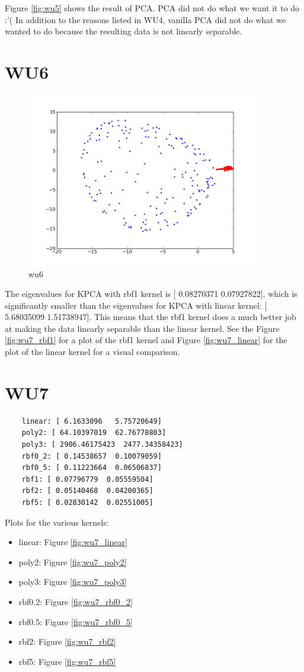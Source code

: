 Figure \ref{fig:wu5} shows the result of PCA. 
PCA did not do what we want it to do :'(
In addition to the reasons listed in WU4, vanilla PCA 
did not do what we wanted to do because the resulting data 
is not linearly separable.

\section*{WU6}
\begin{figure}[here]
	\center
	\caption{wu6}
	\label{fig:wu6}
	\includegraphics[width=4.0in]{img/wu7_rbf1.png}
\end{figure}

The eigenvalues for KPCA with rbf1 kernel is [ 0.08270371  0.07927822], which is significantly smaller than
the eigenvalues for KPCA with linear kernel: [ 5.68035099  1.51738947]. This means that the rbf1 kernel does a much 
better job at making the data linearly separable than the linear kernel. See the Figure \ref{fig:wu7_rbf1} for a plot of the rbf1 kernel and Figure \ref{fig:wu7_linear} for the plot of the linear kernel for a visual comparison.

\section*{WU7}
\begin{verbatim}
	linear: [ 6.1633096   5.75720649]
	poly2: [ 64.10397019  62.76778803]
	poly3: [ 2906.46175423  2477.34358423]
	rbf0_2: [ 0.14538657  0.10079059]
	rbf0_5: [ 0.11223664  0.06506837]
	rbf1: [ 0.07796779  0.05559504]
	rbf2: [ 0.05140468  0.04200365]
	rbf5: [ 0.02830142  0.02551005]

\end{verbatim}
Plots for the various kernels:
\begin{itemize}
	\item linear: Figure \ref{fig:wu7_linear}
	\item poly2: Figure \ref{fig:wu7_poly2}
	\item poly3: Figure \ref{fig:wu7_poly3}
	\item rbf0.2: Figure \ref{fig:wu7_rbf0_2}
	\item rbf0.5: Figure \ref{fig:wu7_rbf0_5}
	\item rbf2: Figure \ref{fig:wu7_rbf2}
	\item rbf5: Figure \ref{fig:wu7_rbf5}
\end{itemize}


